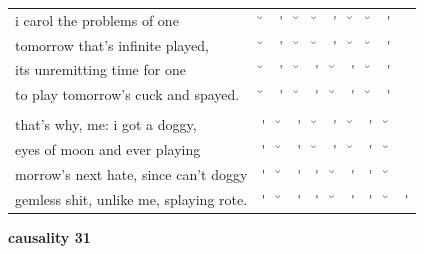 \documentclass[12pt, landscape]{article}
\begin{document}
\begin{center}
\begin{tabularx}{\textwidth}{
>{\lefting\arraybackslash}X
c
c
c
c
c
c
c
c
c
}

i carol the problems of one & \u{} & \'{} & \u{} & \u{} & \'{} & \u{} & \u{} & \'{} & \\
tomorrow that's infinite played, & \u{} & \'{} & \u{} & \u{} & \'{} & \u{} & \u{} & \'{} & \\
its unremitting time for one & \u{} & \'{} & \u{} & \'{} & \u{} & \'{} & \u{} & \'{} & \\
to play tomorrow's cuck and spayed. & \u{} & \'{} & \u{} & \'{} & \u{} & \'{} & \u{} & \'{} & \\
 & & & & & & & & \\
that's why, me: i got a doggy, & \'{} & \u{} & \'{} & \u{} & \'{} & \u{} & \'{} & \u{} & \\
eyes of moon and ever playing & \'{} & \u{} & \'{} & \u{} & \'{} & \u{} & \'{} & \u{} & \\
morrow's next hate, since can't doggy & \'{} & \u{} & \'{} & \'{} & \u{} & \'{} & \'{} & \u{} &\\
gemless shit, unlike me, splaying rote. & \'{} & \u{} & \'{} & \'{} & \u{} & \'{} & \'{} & \u{} & \'{} \\

\end{tabularx}
\end{center}

\vspace*{\fill}

\newpage

\vspace*{\fill}

\noindent \textbf{causality 31}
\noindent \hfill \par
\end{document}
